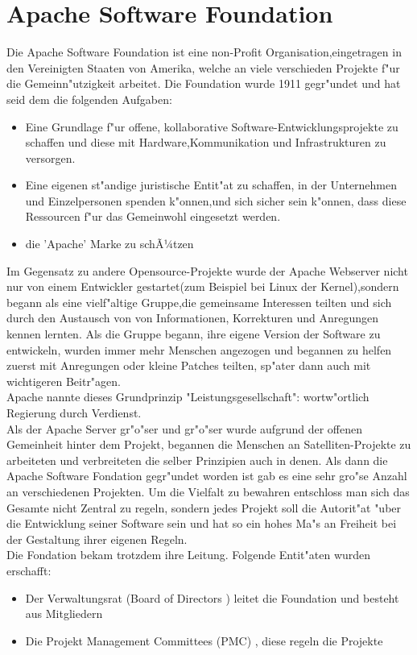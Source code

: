 
\section{Apache Software Foundation}
Die Apache Software Foundation ist eine non-Profit Organisation,eingetragen in den Vereinigten Staaten von Amerika, welche an viele verschieden Projekte f"ur die Gemeinn"utzigkeit arbeitet. Die Foundation wurde 1911 gegr"undet und hat seid dem die folgenden Aufgaben:
\begin{itemize}
\item{Eine Grundlage f"ur offene, kollaborative Software-Entwicklungsprojekte zu schaffen und diese mit Hardware,Kommunikation und Infrastrukturen zu versorgen. }
\item{Eine eigenen st"andige juristische Entit"at zu schaffen, in der Unternehmen und Einzelpersonen spenden k"onnen,und sich sicher sein k"onnen, dass diese Ressourcen f"ur das Gemeinwohl eingesetzt werden.}
\item{die 'Apache' Marke zu schÃ¼tzen}
\end{itemize}
Im Gegensatz zu andere Opensource-Projekte wurde der Apache Webserver nicht nur von einem Entwickler gestartet(zum Beispiel bei Linux der Kernel),sondern begann als eine vielf"altige Gruppe,die gemeinsame Interessen teilten und sich durch den Austausch von  von Informationen, Korrekturen und Anregungen kennen lernten.
Als die Gruppe begann, ihre eigene Version der Software zu entwickeln, wurden immer mehr Menschen angezogen und begannen zu helfen  zuerst  mit Anregungen oder kleine Patches teilten, sp"ater dann auch mit wichtigeren Beitr"agen. \\
Apache nannte dieses Grundprinzip "Leistungsgesellschaft": wortw"ortlich Regierung durch Verdienst.\\
Als der Apache Server gr"o"ser und gr"o"ser  wurde aufgrund der offenen Gemeinheit hinter dem Projekt, begannen die Menschen an Satelliten-Projekte  zu arbeiteten  und verbreiteten die selber Prinzipien auch in denen. Als dann die Apache Software Fondation gegr"undet worden ist gab es eine sehr gro"se Anzahl an verschiedenen Projekten. Um die Vielfalt zu bewahren entschloss man sich das Gesamte nicht Zentral zu regeln, sondern jedes Projekt soll die Autorit"at "uber die Entwicklung seiner Software sein und hat so ein hohes Ma"s an Freiheit bei der Gestaltung ihrer eigenen Regeln. \\
\newpage 
Die Fondation bekam trotzdem ihre Leitung. Folgende Entit"aten wurden erschafft:
\begin{itemize}
\item{Der Verwaltungsrat (Board of Directors ) leitet die Foundation und besteht aus Mitgliedern}
\item{Die Projekt Management Committees (PMC) , diese regeln die Projekte}
\end{itemize}

